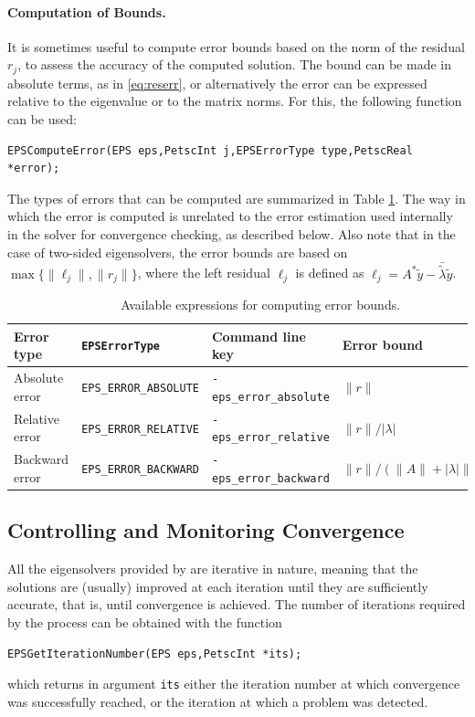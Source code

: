 \paragraph{Computation of Bounds.}
It is sometimes useful to compute error bounds based on the norm of the residual $r_j$, to assess the accuracy of the computed solution. The bound can be made in absolute terms, as in \eqref{eq:reserr}, or alternatively the error can be expressed relative to the eigenvalue or to the matrix norms. For this, the following function can be used:
        \begin{Verbatim}[fontsize=\small]
        EPSComputeError(EPS eps,PetscInt j,EPSErrorType type,PetscReal *error);
        \end{Verbatim}
The types of errors that can be computed are summarized in Table \ref{tab:errors}.
The way in which the error is computed is unrelated to the error estimation used internally in the solver for convergence checking, as described below. Also note that in the case of two-sided eigensolvers, the error bounds are based on $\max\{\|\ell_j\|,\|r_j\|\}$, where the left residual $\ell_j$ is defined as $\ell_j=A^*\tilde{y}-\bar{\tilde\lambda}\tilde{y}$.

\begin{table}
\centering
{\small \begin{tabular}{llll}
Error type     & \texttt{EPSErrorType}         & Command line key               & Error bound \\\hline
Absolute error & \texttt{EPS\_ERROR\_ABSOLUTE} & \texttt{-eps\_error\_absolute} & $\|r\|$ \\
Relative error & \texttt{EPS\_ERROR\_RELATIVE} & \texttt{-eps\_error\_relative} & $\|r\|/|\lambda|$ \\
Backward error & \texttt{EPS\_ERROR\_BACKWARD} & \texttt{-eps\_error\_backward} & $\|r\|/(\|A\|+|\lambda|\|B\|)$ \\
\hline
\end{tabular} }
\caption{\label{tab:errors}Available expressions for computing error bounds.}
\end{table}

\subsection{Controlling and Monitoring Convergence}
\label{sec:monitor}

All the eigensolvers provided by \slepc are iterative in nature, meaning that the solutions are (usually) improved at each iteration until they are sufficiently accurate, that is, until convergence is achieved. The number of iterations required by the process can be obtained with the function%
        \begin{Verbatim}[fontsize=\small]
        EPSGetIterationNumber(EPS eps,PetscInt *its);
        \end{Verbatim}
which returns in argument \texttt{its} either the iteration number at which convergence was successfully reached, or the iteration at which a problem was detected.

